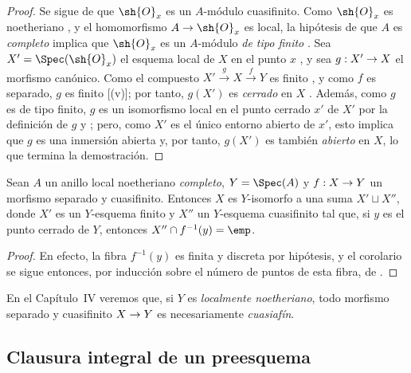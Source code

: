 \documentclass[oneside,10pt]{amsart}
\makeatletter
\newcommand{\ega@arrow}[2]{\mathchoice{#1}{#2}{#2}{#2}}
\renewcommand{\to}{\ega@arrow{\longrightarrow}{\rightarrow}}
\let\EGAOriginalLabel\label
\renewcommand{\label}[1]{\phantomsection\EGAOriginalLabel{#1}}
\makeatother
\begin{document}
\begin{proof}
Se sigue de  que $\sh{O}_x$ es un $A$-módulo cuasifinito.
Como $\sh{O}_x$ es noetheriano , y el homomorfismo $A\to\sh{O}_x$ es local, la hipótesis de que $A$ es \emph{completo} implica que $\sh{O}_x$ es un $A$-módulo \emph{de tipo finito} .
Sea $X'=\Spec(\sh{O}_x)$ el esquema local de $X$ en el punto $x$ , y sea $g:X'\to X$ el morfismo canónico.
Como el compuesto $X'\xrightarrow{g}X\xrightarrow{f}Y$ es finito , y como $f$ es separado, $g$ es finito [(v)]; por tanto, $g(X')$ es \emph{cerrado} en $X$ .
Además, como $g$ es de tipo finito, $g$ es un isomorfismo local en el punto cerrado $x'$ de $X'$ por la definición de $g$ y ;
pero, como $X'$ es el único entorno abierto de $x'$, esto implica que $g$ es una inmersión abierta y, por tanto, $g(X')$ es también \emph{abierto} en $X$, lo que termina la demostración.
\end{proof}

\begin{corollary}[6.2.6]
\label{II.6.2.6}
Sean $A$ un anillo local noetheriano \emph{completo}, $Y=\Spec(A)$ y $f:X\to Y$ un morfismo separado y cuasifinito.
Entonces $X$ es $Y$-isomorfo a una suma $X'\sqcup X''$, donde $X'$ es un $Y$-esquema finito y $X''$ un $Y$-esquema cuasifinito tal que, si $y$ es el punto cerrado de $Y$, entonces $X''\cap f^{-1}(y)=\emp$.
\end{corollary}

\begin{proof}
En efecto, la fibra $f^{-1}(y)$ es finita y discreta por hipótesis, y el corolario se sigue entonces, por inducción sobre el número de puntos de esta fibra, de .
\end{proof}

\begin{remark}[6.2.7]
\label{II.6.2.7}
En el Capítulo~IV veremos que, si $Y$ es \emph{localmente noetheriano}, todo morfismo separado y cuasifinito $X\to Y$ es necesariamente \emph{cuasiafín}.
\end{remark}

\subsection{Clausura integral de un preesquema}
\label{subsection:II.6.3}
\end{document}
